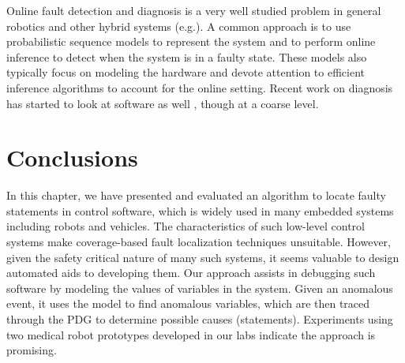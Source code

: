 Online fault detection and diagnosis is a very well studied problem in general robotics and other hybrid systems (e.g.\cite{halder2007robust,mcintyre2005fault,verma2004real}). A common approach is to use probabilistic sequence models to represent the system and to perform online inference to detect when the system is in a faulty state. These models also typically focus on modeling the hardware and devote attention to efficient inference algorithms to account for the online setting. Recent work on diagnosis has started to look at software as well \cite{mikaelian2005model}, though at a coarse level.

\section{Conclusions}
In this chapter, we have presented and evaluated an algorithm to locate faulty statements in control software, which is widely used in many embedded systems including robots and vehicles. The characteristics of such low-level control systems make coverage-based fault localization techniques unsuitable. However, given the safety critical nature of many such systems, it seems valuable to design automated aids to developing them. Our approach assists in debugging such software by modeling the values of variables in the system. Given an anomalous event, it uses the model to find anomalous variables, which are then traced through the PDG to determine possible causes (statements). Experiments using two medical robot prototypes developed in our labs indicate the approach is promising.